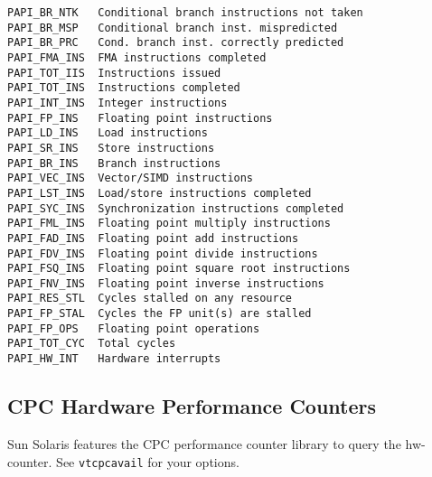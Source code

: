 \begin{multicols}{3}
\begin{scriptsize}
\begin{verbatim}
PAPI_BR_NTK   Conditional branch instructions not taken           
PAPI_BR_MSP   Conditional branch inst. mispredicted        
PAPI_BR_PRC   Cond. branch inst. correctly predicted 
PAPI_FMA_INS  FMA instructions completed                          
PAPI_TOT_IIS  Instructions issued                                 
PAPI_TOT_INS  Instructions completed                              
PAPI_INT_INS  Integer instructions                                
PAPI_FP_INS   Floating point instructions                         
PAPI_LD_INS   Load instructions                                   
PAPI_SR_INS   Store instructions                                  
PAPI_BR_INS   Branch instructions                                 
PAPI_VEC_INS  Vector/SIMD instructions                            
PAPI_LST_INS  Load/store instructions completed                   
PAPI_SYC_INS  Synchronization instructions completed              
PAPI_FML_INS  Floating point multiply instructions                
PAPI_FAD_INS  Floating point add instructions                     
PAPI_FDV_INS  Floating point divide instructions                  
PAPI_FSQ_INS  Floating point square root instructions             
PAPI_FNV_INS  Floating point inverse instructions                 
PAPI_RES_STL  Cycles stalled on any resource    
PAPI_FP_STAL  Cycles the FP unit(s) are stalled 
PAPI_FP_OPS   Floating point operations         
PAPI_TOT_CYC  Total cycles                      
PAPI_HW_INT   Hardware interrupts               
\end{verbatim} 
\end{scriptsize}



\subsection*{CPC Hardware Performance Counters}
Sun Solaris features the CPC performance counter library to query the hw-counter. See \texttt{vtcpcavail} for your options.


\end{multicols}
